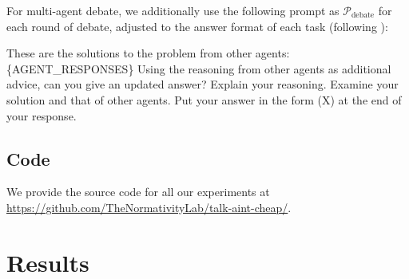 \documentclass{article}
\begin{document}
For multi-agent debate, we additionally use the following prompt as $\mathcal{P}_{\text{debate}}$ for each round of debate, adjusted to the answer format of each task (following \cite{du2023improvingfactualityreasoninglanguage}):

\begin{tcolorbox}[
    colback=gray!5,
    colframe=gray!50,
    title={\textbf{Debate prompt}, $\mathcal{P}_{\text{debate}}$},
    fonttitle=\bfseries,
    boxrule=1pt,
    arc=3pt,
    left=8pt,
    right=8pt,
    top=8pt,
    bottom=8pt
    ]
    These are the solutions to the problem from other agents: \{AGENT\_RESPONSES\} Using the reasoning from other agents as additional advice, can you give an updated answer? Explain your reasoning. Examine your solution and that of other agents. Put your answer in the form (X) at the end of your response.
\end{tcolorbox}

\subsection{Code}
We provide the source code for all our experiments at \url{https://github.com/TheNormativityLab/talk-aint-cheap/}. 



\section{Results}
\label{sec:results}
\end{document}
